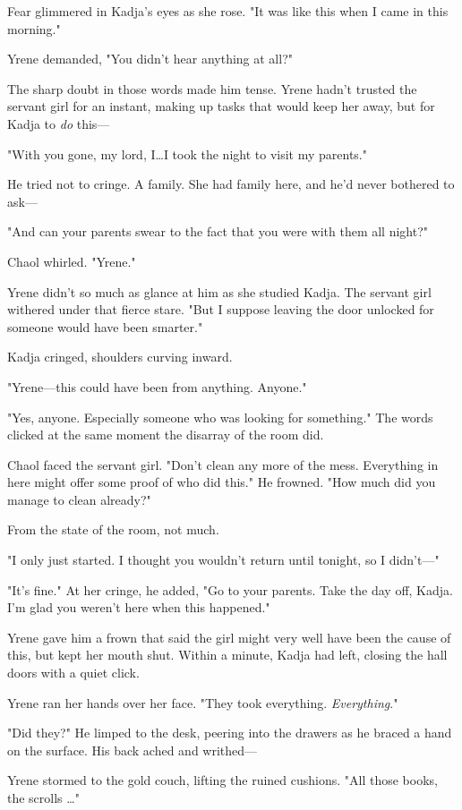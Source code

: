 Fear glimmered in Kadja's eyes as she rose.
"It was like this when I came in this morning."

Yrene demanded, "You didn't hear anything at all?"

The sharp doubt in those words made him tense.
Yrene hadn't trusted the servant girl for an instant, making up tasks that would keep her away, but for Kadja to \emph{do} this---

"With you gone, my lord, I\ldots I took the night to visit my parents."

He tried not to cringe.
A family.
She had family here, and he'd never bothered to ask---

"And can your parents swear to the fact that you were with them all night?"

Chaol whirled.
"Yrene."

Yrene didn't so much as glance at him as she studied Kadja.
The servant girl withered under that fierce stare.
"But I suppose leaving the door unlocked for someone would have been smarter."

Kadja cringed, shoulders curving inward.

"Yrene---this could have been from anything.
Anyone."

"Yes, anyone.
Especially someone who was looking for something."
The words clicked at the same moment the disarray of the room did.

Chaol faced the servant girl.
"Don't clean any more of the mess.
Everything in here might offer some proof of who did this."
He frowned.
"How much did you manage to clean already?"

From the state of the room, not much.

"I only just started.
I thought you wouldn't return until tonight, so I didn't---"

"It's fine."
At her cringe, he added, "Go to your parents.
Take the day off, Kadja.
I'm glad you weren't here when this happened."

Yrene gave him a frown that said the girl might very well have been the cause of this, but kept her mouth shut.
Within a minute, Kadja had left, closing the hall doors with a quiet click.

Yrene ran her hands over her face.
"They took everything.
\emph{Everything}."

"Did they?"
He limped to the desk, peering into the drawers as he braced a hand on the surface.
His back ached and writhed---

Yrene stormed to the gold couch, lifting the ruined cushions.
"All those books, the scrolls \ldots"

